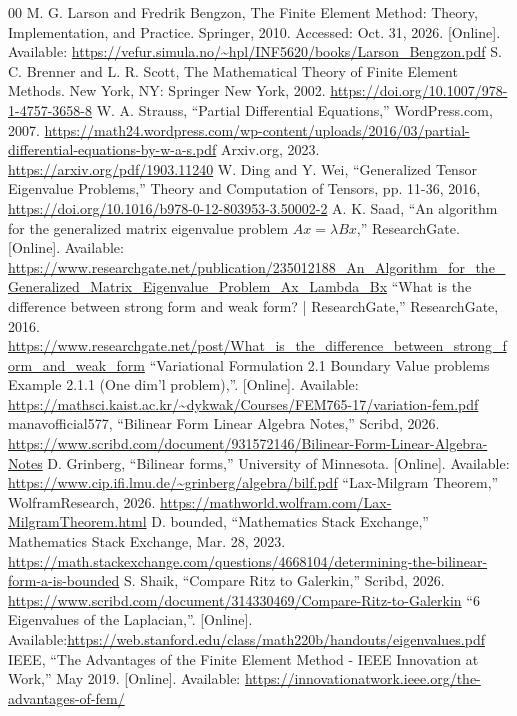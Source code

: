 \documentclass[conference]{IEEEtran}
\begin{document}
\newpage
\begin{thebibliography}{00}
 M. G. Larson and Fredrik Bengzon, The Finite Element Method: Theory, Implementation, and Practice. Springer, 2010. Accessed: Oct. 31, 2026. [Online]. Available: \url{https://vefur.simula.no/~hpl/INF5620/books/Larson_Bengzon.pdf}
 S. C. Brenner and L. R. Scott, The Mathematical Theory of Finite Element Methods. New York, NY: Springer New York, 2002. \url{https://doi.org/10.1007/978-1-4757-3658-8}
 W. A. Strauss, “Partial Differential Equations,” WordPress.com, 2007. \url{https://math24.wordpress.com/wp-content/uploads/2016/03/partial-differential-equations-by-w-a-s.pdf}
 Arxiv.org, 2023. \url{https://arxiv.org/pdf/1903.11240} 
 W. Ding and Y. Wei, “Generalized Tensor Eigenvalue Problems,” Theory and Computation of Tensors, pp. 11-36, 2016, \url{https://doi.org/10.1016/b978-0-12-803953-3.50002-2}
 A. K. Saad, “An algorithm for the generalized matrix eigenvalue problem $Ax=\lambda Bx$,” ResearchGate. [Online]. Available: \url{https://www.researchgate.net/publication/235012188_An_Algorithm_for_the_Generalized_Matrix_Eigenvalue_Problem_Ax_Lambda_Bx}
 “What is the difference between strong form and weak form? | ResearchGate,” ResearchGate, 2016. \url{https://www.researchgate.net/post/What_is_the_difference_between_strong_form_and_weak_form}
 “Variational Formulation 2.1 Boundary Value problems Example 2.1.1 (One dim'l problem),”. [Online]. Available: \url{https://mathsci.kaist.ac.kr/~dykwak/Courses/FEM765-17/variation-fem.pdf}
 manavofficial577, “Bilinear Form Linear Algebra Notes,” Scribd, 2026. \url{https://www.scribd.com/document/931572146/Bilinear-Form-Linear-Algebra-Notes}
 D. Grinberg, “Bilinear forms,” University of Minnesota. [Online]. Available: \url{https://www.cip.ifi.lmu.de/~grinberg/algebra/bilf.pdf}
 “Lax-Milgram Theorem,” WolframResearch, 2026. \url{https://mathworld.wolfram.com/Lax-MilgramTheorem.html}
 D. bounded, “Mathematics Stack Exchange,” Mathematics Stack Exchange, Mar. 28, 2023. \url{https://math.stackexchange.com/questions/4668104/determining-the-bilinear-form-a-is-bounded}
 S. Shaik, “Compare Ritz to Galerkin,” Scribd, 2026. \url{https://www.scribd.com/document/314330469/Compare-Ritz-to-Galerkin}
 “6 Eigenvalues of the Laplacian,”. [Online]. Available:\url{https://web.stanford.edu/class/math220b/handouts/eigenvalues.pdf}
 IEEE, “The Advantages of the Finite Element Method - IEEE Innovation at Work,” May 2019. [Online]. Available: \url{https://innovationatwork.ieee.org/the-advantages-of-fem/}

\end{thebibliography}
\end{document}

